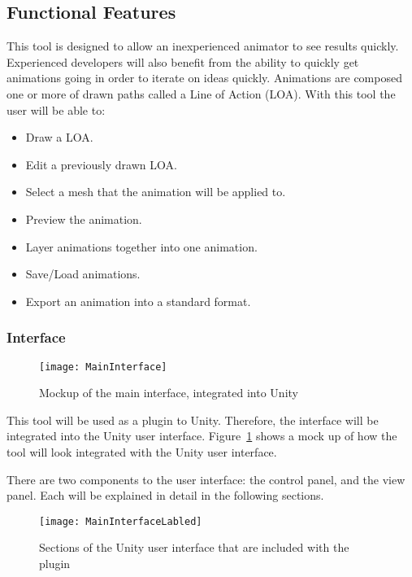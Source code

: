 \subsection{Functional Features}
	This tool is designed to allow an inexperienced animator to see results quickly.  Experienced developers will also benefit from the ability to quickly get animations going in order to iterate on ideas quickly.  
	Animations are composed one or more of drawn paths called a Line of Action (LOA).  With this tool the user will be able to:
\begin{itemize}
	\item Draw a LOA.
	\item Edit a previously drawn LOA.
	\item Select a mesh that the animation will be applied to.
	\item Preview the animation.
	\item Layer animations together into one animation.
	\item Save/Load animations.
	\item Export an animation into a standard format.
\end{itemize}
\subsubsection{Interface}
\begin{figure}[H]
\centering
\texttt{[image: MainInterface]}
\caption{Mockup of the main interface, integrated into Unity}
\label{fig:interface}
\end{figure}
This tool will be used as a plugin to Unity.  Therefore, the interface will be integrated into the Unity user interface.  Figure~\ref{fig:interface} shows a mock up of how the tool will look integrated with the Unity user interface.

There are two components to the user interface: the control panel, and the view panel.  Each will be explained in detail in the following sections.
\begin{figure}[H]
\centering
\texttt{[image: MainInterfaceLabled]}
\caption{Sections of the Unity user interface that are included with the plugin}
\label{fig:interfaceLabled}
\end{figure}
